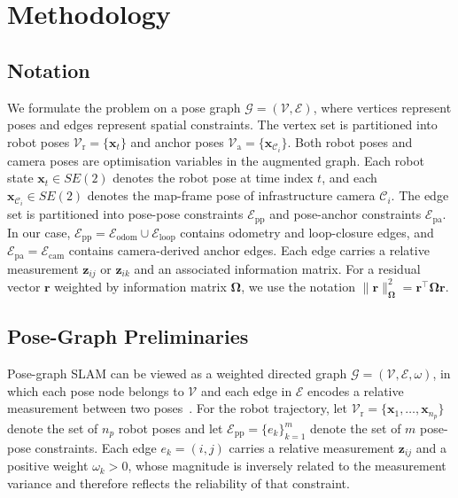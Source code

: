 \section{Methodology}
\label{sec:methodology}


\subsection{Notation}

We formulate the problem on a pose graph
$\mathcal{G} = (\mathcal{V}, \mathcal{E})$, where vertices represent poses
and edges represent spatial constraints.
The vertex set is partitioned into robot poses
$\mathcal{V}_{\mathrm{r}} = \{\mathbf{x}_t\}$ and anchor poses
$\mathcal{V}_{\mathrm{a}} = \{\mathbf{x}_{\mathcal{C}_i}\}$.
Both robot poses and camera poses are optimisation variables in the augmented
graph. Each robot state $\mathbf{x}_t \in SE(2)$ denotes the robot pose at
time index $t$, and each $\mathbf{x}_{\mathcal{C}_i} \in SE(2)$ denotes the
map-frame pose of infrastructure camera $\mathcal{C}_i$.
The edge set is partitioned into pose-pose constraints
$\mathcal{E}_{\mathrm{pp}}$ and pose-anchor constraints
$\mathcal{E}_{\mathrm{pa}}$.
In our case,
$\mathcal{E}_{\mathrm{pp}} = \mathcal{E}_{\mathrm{odom}} \cup \mathcal{E}_{\mathrm{loop}}$
contains odometry and loop-closure edges, and
$\mathcal{E}_{\mathrm{pa}} = \mathcal{E}_{\mathrm{cam}}$
contains camera-derived anchor edges.
Each edge carries a relative measurement
$\mathbf{z}_{ij}$ or $\mathbf{z}_{ik}$ and an associated information matrix.
For a residual vector $\mathbf{r}$ weighted by information matrix
$\boldsymbol{\Omega}$, we use the notation
$\|\mathbf{r}\|^2_{\boldsymbol{\Omega}} =
\mathbf{r}^{\top} \boldsymbol{\Omega} \mathbf{r}$.

\subsection{Pose-Graph Preliminaries}

Pose-graph SLAM can be viewed as a weighted directed graph
$\mathcal{G} = (\mathcal{V}, \mathcal{E}, \omega)$, in which each pose node
belongs to $\mathcal{V}$ and each edge in $\mathcal{E}$ encodes a relative
measurement between two poses~\cite{chen2022anchor}.
For the robot trajectory, let
$\mathcal{V}_{\mathrm{r}} = \{\mathbf{x}_1, \ldots, \mathbf{x}_{n_p}\}$
denote the set of $n_p$ robot poses and let
$\mathcal{E}_{\mathrm{pp}} = \{e_k\}_{k=1}^{m}$ denote the set of $m$
pose-pose constraints.
Each edge $e_k = (i,j)$ carries a relative measurement
$\mathbf{z}_{ij}$ and a positive weight $\omega_k > 0$, whose magnitude is
inversely related to the measurement variance and therefore reflects the
reliability of that constraint.

